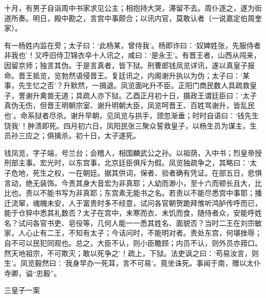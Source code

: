 \documentclass[]{article}
\begin{document}
十月，有男子自诣周中书家求见公主；相抱持大哭，滞留不去。周仆逐之，遂为街道所奏。明日，殿中勘之，言宫中事颇合；以讯内官，莫敢认者（一说嘉定伯周奎家）。

有一杨姓内监在旁；太子曰：`此杨某，曾侍我'。杨即诈曰：`奴婢姓张，先服侍者非我也'！又呼旧侍卫锦衣卒十人讯之，咸曰：`是永王'。有晋王者，山西从闯来，因留京师；独言其伪。于是言真者，皆下狱。刑曹郎钱凤览详讯，遂以真皇子报命。晋王抵览，览勃然语侵晋王。复廷讯之，内阁谢升执以为伪；太子曰：`某事，先生忆之否'？升默然，一揖退。凤览面叱升不臣。正阳门商民数人具疏救皇子，詈谢升禽兽无道；具疏人亦下狱。乙酉正月初十日，摄政王谓廷臣曰：`太子真伪无伤，但晋王明朝宗室、谢升明朝大臣，凤览呵晋王、百姓骂谢升，皆乱民也'。命系狱者尽杀。谢升早朝，见凤览与拱手，颈忽渐垂；时时自语曰：`钱先生饶我'！肿溃即死。四月初六日，凤阳民张三聚众誓救皇子，以杨生员为谋主，生员孙三应之；俱擒杀。初十日，太子遂死。

钱凤览，字子端，号兰台；会稽人，相国麟武公之孙。以祖荫，入中书；烈皇帝授刑部主事。宏光时，以东宫事，北京廷臣俱斥为假。凤览独疏争之，其略曰：`太子危地，死生之权，一在朝廷。据其供词，保者、验者确有凭证。在部五日，悲惧言动，绝无装饰。今责其身大音宏为非真耶；人幼而渺小，至十六而顿长且大，比比也。责以不能书写为非真耶；东宫素无能书之名。若责以不能尽悉宫中事耶；播迁流窜，魂魄未安，人于富贵时多不经意，试问各官朝贺跪拜惟听鸿胪传呼而已，能于仓猝中悉其礼数否？太子在宫中，未寒而衣、未饥而食，随侍者众，安能呼姓名？试问各官书吏、皂役等，几何人能一一悉其姓名、面貌否？当时二王在刘宗敏家，人心止有二王，不知有太子；今诘问时，不能明对者。贵处东宫，何堪挫辱；自不可以民犯同观也。总之，大臣不认，则小臣瞻顾；内员不认，则外员亦箝口。然天地祖宗，不可欺灭；敢以死争之'！疏上，下狱。法吏讽之曰：`苟易汝言，则生'。凤览毅然曰：`我身早办一死耳，言不可易'。竟坐诛死。事闻于南，赠以太仆寺卿，谥``忠毅''。

三皇子一案
\end{document}
